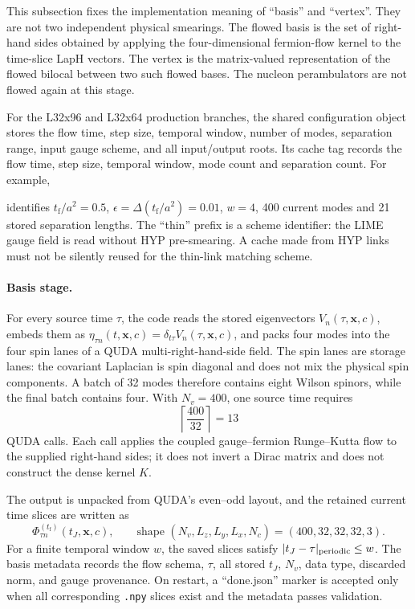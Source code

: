 \documentclass[11pt]{article}
\numberwithin{equation}{section}
\newcommand{\tf}{t_{\mathrm f}}
\begin{document}
This subsection fixes the implementation meaning of ``basis'' and
``vertex''.  They are not two independent physical smearings.  The flowed
basis is the set of right-hand sides obtained by applying the four-dimensional
fermion-flow kernel to the time-slice LapH vectors.  The vertex is the
matrix-valued representation of the flowed bilocal between two such flowed
bases.  The nucleon perambulators are not flowed again at this stage.

For the L32x96 and L32x64 production branches, the shared configuration object
stores the flow time, step size, temporal window, number of modes, separation
range, input gauge scheme, and all input/output roots.  Its cache tag records
the flow time, step size, temporal window, mode count and separation count.
For example,
\begin{center}
\end{center}
identifies \(\tf/a^2=0.5\), \(\epsilon=\Delta(\tf/a^2)=0.01\), \(w=4\), 400 current
modes and 21 stored separation lengths.
The ``thin'' prefix is a scheme identifier: the LIME gauge field is read
without HYP pre-smearing.  A cache made from HYP links must not be silently
reused for the thin-link matching scheme.

\paragraph{Basis stage.}
For every source time \(\tau\), the code reads the stored eigenvectors
\(V_n(\tau,\bm x,c)\), embeds them as
\(\eta_{\tau n}(t,\bm x,c)=\delta_{t\tau}V_n(\tau,\bm x,c)\), and packs
four modes into the four spin lanes of a QUDA multi-right-hand-side field.
The spin lanes are storage lanes: the covariant Laplacian is spin diagonal and
does not mix the physical spin components.  A batch of 32 modes therefore
contains eight Wilson spinors, while the final batch contains four.  With
\(N_v=400\), one source time requires
\begin{equation}
  \left\lceil\frac{400}{32}\right\rceil=13
\end{equation}
QUDA calls.  Each call applies the coupled gauge--fermion Runge--Kutta flow
to the supplied right-hand sides; it does not invert a Dirac matrix and does
not construct the dense kernel \(K\).

The output is unpacked from QUDA's even--odd layout, and the retained current
time slices are written as
\begin{equation}
  \Phi_{\tau n}^{(\tf)}(t_J,\bm x,c),
  \qquad
  \text{shape }(N_v,L_z,L_y,L_x,N_c)=(400,32,32,32,3).
  \label{eq:code-flowed-basis-shape}
\end{equation}
For a finite temporal window \(w\), the saved slices satisfy
\( |t_J-\tau|_{\rm periodic}\leq w\).  The basis metadata records the flow
schema, \(\tau\), all stored \(t_J\), \(N_v\), data type, discarded norm,
and gauge provenance.  On restart, a ``done.json'' marker is accepted only
when all corresponding \texttt{.npy} slices exist and the metadata passes
validation.
\end{document}
